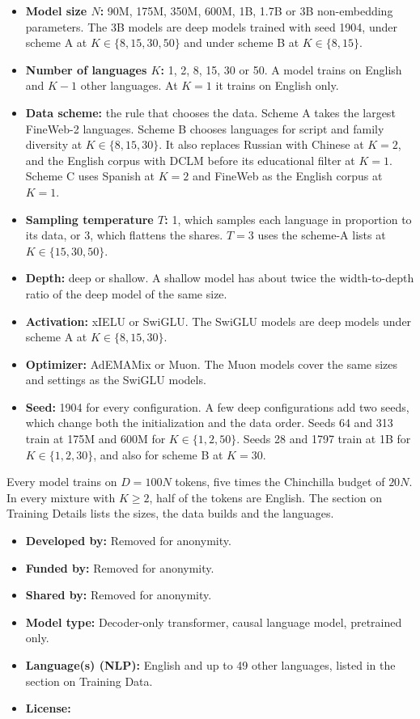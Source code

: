 \begin{itemize}[itemsep=1pt,topsep=2pt]
    \item \textbf{Model size $N$:} 90M, 175M, 350M, 600M, 1B, 1.7B or 3B non-embedding parameters. The 3B models are deep models trained with seed 1904, under scheme A at $K \in \{8, 15, 30, 50\}$ and under scheme B at $K \in \{8, 15\}$.
    \item \textbf{Number of languages $K$:} 1, 2, 8, 15, 30 or 50. A model trains on English and $K-1$ other languages. At $K=1$ it trains on English only.
    \item \textbf{Data scheme:} the rule that chooses the data. Scheme A takes the largest FineWeb-2 languages. Scheme B chooses languages for script and family diversity at $K \in \{8, 15, 30\}$. It also replaces Russian with Chinese at $K=2$, and the English corpus with DCLM before its educational filter at $K=1$. Scheme C uses Spanish at $K=2$ and FineWeb as the English corpus at $K=1$.
    \item \textbf{Sampling temperature $T$:} 1, which samples each language in proportion to its data, or 3, which flattens the shares. $T=3$ uses the scheme-A lists at $K \in \{15, 30, 50\}$.
    \item \textbf{Depth:} deep or shallow. A shallow model has about twice the width-to-depth ratio of the deep model of the same size.
    \item \textbf{Activation:} xIELU or SwiGLU. The SwiGLU models are deep models under scheme A at $K \in \{8, 15, 30\}$.
    \item \textbf{Optimizer:} AdEMAMix or Muon. The Muon models cover the same sizes and settings as the SwiGLU models.
    \item \textbf{Seed:} 1904 for every configuration. A few deep configurations add two seeds, which change both the initialization and the data order. Seeds 64 and 313 train at 175M and 600M for $K \in \{1, 2, 50\}$. Seeds 28 and 1797 train at 1B for $K \in \{1, 2, 30\}$, and also for scheme B at $K=30$.
\end{itemize}

Every model trains on $D = 100N$ tokens, five times the Chinchilla budget of $20N$. In every mixture with $K \ge 2$, half of the tokens are English. The section on Training Details lists the sizes, the data builds and the languages.

\begin{itemize}[itemsep=1pt,topsep=2pt]
    \item \textbf{Developed by:} Removed for anonymity.
    \item \textbf{Funded by:} Removed for anonymity.
    \item \textbf{Shared by:} Removed for anonymity.
    \item \textbf{Model type:} Decoder-only transformer, causal language model, pretrained only.
    \item \textbf{Language(s) (NLP):} English and up to 49 other languages, listed in the section on Training Data.
    \item \textbf{License:} 
\end{itemize}

